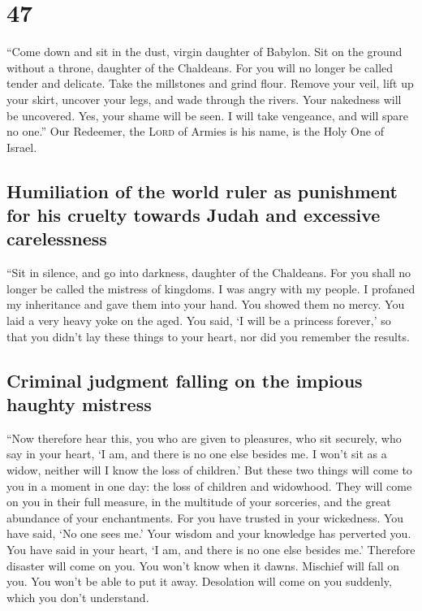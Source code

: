 \hypertarget{section-46}{%
\section{47}\label{section-46}}

 ``Come down and sit in the dust, virgin daughter of
Babylon. Sit on the ground without a throne, daughter of the Chaldeans.
For you will no longer be called tender and delicate. 
Take the millstones and grind flour. Remove your veil, lift up your
skirt, uncover your legs, and wade through the rivers. 
Your nakedness will be uncovered. Yes, your shame will be seen. I will
take vengeance, and will spare no one.''  Our Redeemer,
the \textsc{Lord} of Armies is his name, is the Holy One of Israel.

\hypertarget{humiliation-of-the-world-ruler-as-punishment-for-his-cruelty-towards-judah-and-excessive-carelessness}{%
\subsection{Humiliation of the world ruler as punishment for his cruelty
towards Judah and excessive
carelessness}\label{humiliation-of-the-world-ruler-as-punishment-for-his-cruelty-towards-judah-and-excessive-carelessness}}

 ``Sit in silence, and go into darkness, daughter of the
Chaldeans. For you shall no longer be called the mistress of kingdoms.
 I was angry with my people. I profaned my inheritance and
gave them into your hand. You showed them no mercy. You laid a very
heavy yoke on the aged.  You said, `I will be a princess
forever,' so that you didn't lay these things to your heart, nor did you
remember the results.

\hypertarget{criminal-judgment-falling-on-the-impious-haughty-mistress}{%
\subsection{Criminal judgment falling on the impious haughty
mistress}\label{criminal-judgment-falling-on-the-impious-haughty-mistress}}

 ``Now therefore hear this, you who are given to
pleasures, who sit securely, who say in your heart, `I am, and there is
no one else besides me. I won't sit as a widow, neither will I know the
loss of children.'  But these two things will come to you
in a moment in one day: the loss of children and widowhood. They will
come on you in their full measure, in the multitude of your sorceries,
and the great abundance of your enchantments.  For you
have trusted in your wickedness. You have said, `No one sees me.' Your
wisdom and your knowledge has perverted you. You have said in your
heart, `I am, and there is no one else besides me.' 
Therefore disaster will come on you. You won't know when it dawns.
Mischief will fall on you. You won't be able to put it away. Desolation
will come on you suddenly, which you don't understand.

